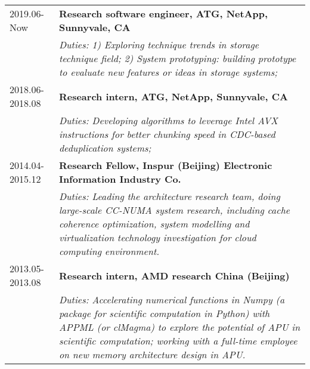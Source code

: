 \documentclass{article}
\begin{document}
    \begin{tabular}{lp{15cm}}
         2019.06-Now & \bf{Research software engineer, ATG, NetApp, Sunnyvale, CA} \\
         & \small{\it Duties: 1) Exploring technique trends in storage technique field; 2) System prototyping: building prototype to evaluate new features or ideas in storage systems;}\\
         2018.06-2018.08 & \bf{Research intern, ATG, NetApp, Sunnyvale, CA}\\
         & \small{\it Duties: Developing algorithms to leverage Intel AVX instructions for better chunking speed in CDC-based deduplication systems;}\\
         2014.04-2015.12 &\bf{Research Fellow,  Inspur (Beijing) Electronic Information Industry Co.}\\
         & \small{\it Duties: Leading the architecture research team, doing large-scale CC-NUMA system research, including cache coherence optimization, system modelling and virtualization technology investigation for cloud computing environment. }\\
         2013.05-2013.08 & \bf {Research intern, AMD research China (Beijing)}\\
         &\small{\it Duties: Accelerating numerical functions in Numpy (a package for scientific computation in Python) with APPML (or clMagma) to explore the potential of APU in scientific computation; working with a full-time employee on new memory architecture design in APU.}
    \end{tabular}
\end{document}
